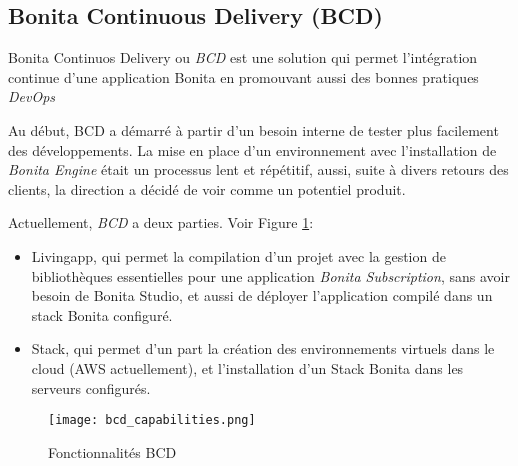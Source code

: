 \subsection{Bonita Continuous Delivery (BCD)} \label{bcd}
Bonita Continuos Delivery ou \textit{BCD} est une solution qui permet l'intégration continue d'une application Bonita en promouvant aussi des bonnes pratiques \emph{DevOps}

Au début, BCD a démarré à partir d'un besoin interne de tester plus facilement des développements. La mise en place d'un environnement avec l'installation de \textit{Bonita Engine} était un processus lent et répétitif, aussi, suite à divers retours des clients, la direction a décidé de voir comme un potentiel produit.

Actuellement, \textit{BCD} a deux parties. Voir Figure \ref{fig:bcd_cap}:
\begin{itemize}
  \item Livingapp, qui permet la compilation d'un projet avec la gestion de bibliothèques essentielles pour une application \textit{Bonita Subscription}, sans avoir besoin de Bonita Studio, et aussi de déployer l'application compilé dans un stack Bonita configuré.
  \item Stack, qui permet d'un part la création des environnements virtuels dans le cloud (AWS actuellement), et l’installation d'un Stack Bonita dans les serveurs configurés.
\end{itemize}

\begin{figure}[!ht]
\centering
\texttt{[image: bcd\_capabilities.png]}
\caption{Fonctionnalités BCD}
\label{fig:bcd_cap}
\end{figure}
